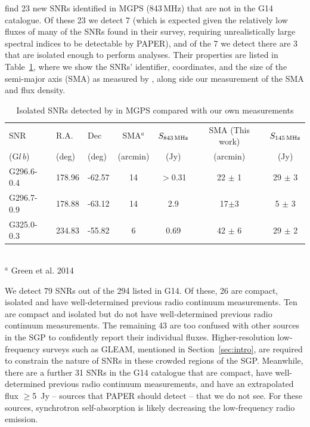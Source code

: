 \documentclass[useAMS,usenatbib]{mn2e}
\begin{document}
\cite{AGreen.14} find 23 new SNRs identified in MGPS (843\,MHz) that are not in the G14 catalogue. Of these 23 we detect 7 (which is expected given the relatively low fluxes of many of the SNRs found in their survey, requiring unrealistically large spectral indices to be detectable by PAPER), and of the 7 we detect there are 3 that are isolated enough to perform analyses. Their properties are listed in Table~\ref{tab:AG}, where we show the SNRs' identifier, coordinates, and the size of the semi-major axis (SMA) as measured by \citep{AGreen.14}, along side our measurement of the SMA and flux density.

\begin{table}
\caption{Isolated SNRs detected by \protect\citep{AGreen.14} in MGPS compared with our own measurements}
\begin{tabular}{lllcccc}
\hline
SNR & R.A. & Dec & SMA$^a$ & $S_{843\,{\rm MHz}}$ & SMA (This work) & $S_{145\,{\rm MHz}}$ \\
(G$l\,b$)	&	(deg)	&	(deg)	&	(arcmin)	&	(Jy)		&	(arcmin)			&	(Jy)			\\
\hline
G296.6-0.4 & 178.96 & -62.57 & 14 & $>$0.31 & 22 $\pm$ 1 & 29 $\pm$ 3 \\
G296.7-0.9 & 178.88 & -63.12 & 14 & 2.9 & 17$\pm$3 & 5 $\pm$ 3 \\
G325.0-0.3 & 234.83 & -55.82 & 6   & 0.69 & 42 $\pm$ 6 & 29 $\pm$ 2 \\
\hline
\end{tabular}
\\
$^a$ Green et al. 2014
\label{tab:AG}
\end{table}

We detect 79 SNRs out of the 294 listed in G14. Of these, 26 are compact, isolated and have well-determined previous radio continuum measurements. Ten are compact and isolated but do not have well-determined previous radio continuum measurements. The remaining 43 are too confused with other sources in the SGP to confidently report their individual fluxes. Higher-resolution low-frequency surveys such as GLEAM, mentioned in Section~\ref{sec:intro}, are required to constrain the nature of SNRs in these crowded regions of the SGP. Meanwhile, there are a further 31 SNRs in the G14 catalogue that are compact, have well-determined previous radio continuum measurements, and have an extrapolated flux $\geq$5\, Jy -- sources that PAPER should detect -- that we do not see. For these sources, synchrotron self-absorption is likely decreasing the low-frequency radio emission.
\end{document}
